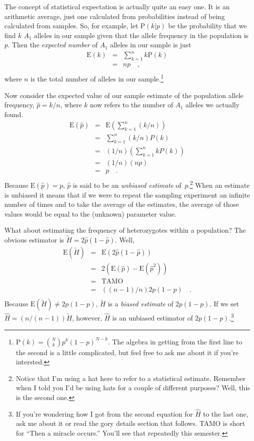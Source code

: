 The concept of statistical expectation is actually quite an easy
one. It is an arithmetic average, just one calculated from
probabilities instead of being calculated from samples. So, for
example, let $\mbox{P}(k|p)$ be the probability that we find $k$ $A_1$
alleles in our sample given that the allele frequency in the
population is $p$. Then the {\it expected number\/} of $A_1$ alleles
in our sample is just
\begin{eqnarray*}
\mbox{E}(k) &=& \sum_{k=1}^n k \mbox{P}(k) \\
     &=& n p \quad , \\
\end{eqnarray*}
where $n$ is the total number of alleles in our
sample.\footnote{$\mbox{P}(k) = {N \choose k}p^k(1-p)^{N-k}$. The
  algebra in getting from the first line to the second is a little
  complicated, but feel free to ask me about it if you're intersted.}

Now consider the expected value of our sample estimate of the
population allele frequency, $\hat p = k/n$, where $k$ now refers to
the number of $A_1$ alleles we actually found.
\begin{eqnarray*}
\mbox{E}(\hat p) &=& \mbox{E}\left(\sum_{k=1}^n (k/n)\right) \\
          &=& \sum_{k=1}^n (k/n) P(k) \\
          &=& (1/n)\left(\sum_{k=1}^n k P(k)\right) \\
          &=& (1/n)(n p) \\
          &=& p \quad . \\
\end{eqnarray*}
Because $\mbox{E}(\hat p) = p$, $\hat p$ is said to be an {\it
  unbiased estimate} of~$p$.\footnote{Notice
  that I'm using a hat here to refer to a statistical
  estimate. Remember when I told you I'd be using hats for a couple of
  different purposes? Well, this is the second one.} When an estimate
is unbiased it means that if we were to repeat the sampling experiment
an infinite number of times and to take the average of the estimates,
the average of those values would be equal to the (unknown) parameter
value.

What about estimating the frequency of heterozygotes within a
population? The obvious estimator is $\tilde H = 2\hat p (1 - \hat
p)$. Well,
\begin{eqnarray*}
\mbox{E}(\tilde H) &=& \mbox{E}\left(2\hat p (1 - \hat p)\right) \\
     &=& 2\left(\mbox{E}(\hat p) - \mbox{E}({\hat p}^2)\right) \\
     &=& \mbox{TAMO} \\
     &=& ((n-1)/n)2p(1-p) \quad . \\
\end{eqnarray*}
Because $\mbox{E}(\tilde H) \ne 2p(1-p)$, $\tilde H$ is a {\it biased
estimate\/} of $2p(1-p)$. If we set $\hat H = (n/(n-1))\tilde H$,
however, $\hat H$ is an unbiased estimator of $2p(1-p)$.\footnote{If
  you're wondering how I got from the second equation for $\hat H$ to
  the last one, ask me about it or read the gory details section that
  follows. TAMO is short for ``Then a miracle occurs.'' You'll see
  that repeatedly this semester.}

